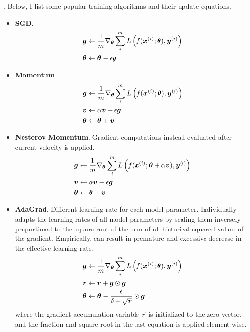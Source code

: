 \documentclass[11pt]{article}
\begin{document}
\myspace
\p {}. Below, I list some popular training algorithms and their update equations. 

\begin{itemize}
	\item \textbf{SGD}.
	\begin{align}
		\bm{g}_{} &\leftarrow \frac{1}{m} \nabla_{\bm{\theta}_{}} \sum_i^m L\left(  f(\bm{x}_{}^{(i)}; \bm{\theta}_{}), \bm{y}_{}^{(i)}   \right) \\
		\bm{\theta}_{} &\leftarrow \bm{\theta}_{} - \epsilon \bm{g}_{}
	\end{align}
	
	\item \textbf{Momentum}.
	\begin{align}
		\bm{g}_{} &\leftarrow \frac{1}{m} \nabla_{\bm{\theta}_{}} \sum_i^m L\left(  f(\bm{x}_{}^{(i)}; \bm{\theta}_{}), \bm{y}_{}^{(i)}   \right) \\
		\bm{v}_{} &\leftarrow \alpha \bm{v}_{} - \epsilon \bm{g}_{} \\
		\bm{\theta}_{} &\leftarrow \bm{\theta}_{} + \bm{v}_{} 
	\end{align}
	
	\item \textbf{Nesterov Momentum}. Gradient computations instead evaluated after current velocity is applied.
	\begin{align}
		\bm{g}_{} &\leftarrow \frac{1}{m} \nabla_{\bm{\theta}_{}} \sum_i^m L\left(  f(\bm{x}_{}^{(i)}; \bm{\theta}_{} + \alpha \bm{v}_{}), \bm{y}_{}^{(i)} \right) \\
		\bm{v}_{} &\leftarrow \alpha \bm{v}_{} - \epsilon \bm{g}_{} \\
		\bm{\theta}_{} &\leftarrow \bm{\theta}_{} + \bm{v}_{} 
	\end{align}
	
	\item \textbf{AdaGrad}. Different learning rate for each model parameter. Individually adapts the learning rates of all model parameters by scaling them inversely proportional to the square root of the sum of all historical squared values of the gradient. Empirically, can result in premature and excessive decrease in the effective learning rate. 
	\begin{align}
		\bm{g}_{} &\leftarrow \frac{1}{m} \nabla_{\bm{\theta}_{}} \sum_i^m L\left(  f(\bm{x}_{}^{(i)}; \bm{\theta}_{}), \bm{y}_{}^{(i)}   \right) \\
		\bm{r}_{} &\leftarrow \bm{r}_{} + \bm{g}_{} \odot \bm{g}_{} \\
		\bm{\theta}_{} &\leftarrow \bm{\theta}_{} - \frac{\epsilon}{\delta + \sqrt{\bm{r}_{}}}  \odot\bm{g}_{}
	\end{align}
	where the gradient accumulation variable $\vec{r}$ is initialized to the zero vector, and the fraction and square root in the last equation is applied element-wise.
	

\end{itemize}
\end{document}
